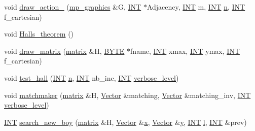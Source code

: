\begin{DoxyCompactItemize}
\item 
void \mbox{\hyperlink{test_8_c_a66d5226d368c0fb8c9578ff6f3462dfc}{draw\+\_\+action\+\_\+}} (\mbox{\hyperlink{classmp__graphics}{mp\+\_\+graphics}} \&G, \mbox{\hyperlink{galois_8h_a09fddde158a3a20bd2dcadb609de11dc}{I\+NT}} $\ast$Adjacency, \mbox{\hyperlink{galois_8h_a09fddde158a3a20bd2dcadb609de11dc}{I\+NT}} m, \mbox{\hyperlink{galois_8h_a09fddde158a3a20bd2dcadb609de11dc}{I\+NT}} \mbox{\hyperlink{simeon_8_c_a7f2cd26777ce0ff3fdaf8d02aacbddfb}{n}}, \mbox{\hyperlink{galois_8h_a09fddde158a3a20bd2dcadb609de11dc}{I\+NT}} f\+\_\+cartesian)
\item 
void \mbox{\hyperlink{test_8_c_aba940d15eaa8abf972749535a2259ebe}{Halls\+\_\+theorem}} ()
\item 
void \mbox{\hyperlink{test_8_c_a4c1e9c00227321ddd2da4d252011fd07}{draw\+\_\+matrix}} (\mbox{\hyperlink{classmatrix}{matrix}} \&H, \mbox{\hyperlink{galois_8h_ab6cc7b4aeb6ea31aba2b3fbfc83ff5e6}{B\+Y\+TE}} $\ast$fname, \mbox{\hyperlink{galois_8h_a09fddde158a3a20bd2dcadb609de11dc}{I\+NT}} xmax, \mbox{\hyperlink{galois_8h_a09fddde158a3a20bd2dcadb609de11dc}{I\+NT}} ymax, \mbox{\hyperlink{galois_8h_a09fddde158a3a20bd2dcadb609de11dc}{I\+NT}} f\+\_\+cartesian)
\item 
void \mbox{\hyperlink{test_8_c_a757609870ae7ab0f1d0073415822d19f}{test\+\_\+hall}} (\mbox{\hyperlink{galois_8h_a09fddde158a3a20bd2dcadb609de11dc}{I\+NT}} \mbox{\hyperlink{simeon_8_c_a7f2cd26777ce0ff3fdaf8d02aacbddfb}{n}}, \mbox{\hyperlink{galois_8h_a09fddde158a3a20bd2dcadb609de11dc}{I\+NT}} nb\+\_\+inc, \mbox{\hyperlink{galois_8h_a09fddde158a3a20bd2dcadb609de11dc}{I\+NT}} \mbox{\hyperlink{simeon_8_c_a818073fbcc2f439e7c56952f67386122}{verbose\+\_\+level}})
\item 
void \mbox{\hyperlink{test_8_c_a93ef2c2e9896d2a9f32ced4136c2784a}{matchmaker}} (\mbox{\hyperlink{classmatrix}{matrix}} \&H, \mbox{\hyperlink{class_vector}{Vector}} \&matching, \mbox{\hyperlink{class_vector}{Vector}} \&matching\+\_\+inv, \mbox{\hyperlink{galois_8h_a09fddde158a3a20bd2dcadb609de11dc}{I\+NT}} \mbox{\hyperlink{simeon_8_c_a818073fbcc2f439e7c56952f67386122}{verbose\+\_\+level}})
\item 
\mbox{\hyperlink{galois_8h_a09fddde158a3a20bd2dcadb609de11dc}{I\+NT}} \mbox{\hyperlink{test_8_c_a00b262498218f35b2c1a68d8dd729714}{search\+\_\+new\+\_\+boy}} (\mbox{\hyperlink{classmatrix}{matrix}} \&H, \mbox{\hyperlink{class_vector}{Vector}} \&\mbox{\hyperlink{alphabet2_8_c_a6150e0515f7202e2fb518f7206ed97dc}{x}}, \mbox{\hyperlink{class_vector}{Vector}} \&\mbox{\hyperlink{alphabet2_8_c_a0a2f84ed7838f07779ae24c5a9086d33}{y}}, \mbox{\hyperlink{galois_8h_a09fddde158a3a20bd2dcadb609de11dc}{I\+NT}} \mbox{\hyperlink{alphabet2_8_c_a89606eca6b563ec68d2da2e84657736f}{l}}, \mbox{\hyperlink{galois_8h_a09fddde158a3a20bd2dcadb609de11dc}{I\+NT}} \&prev)

\end{DoxyCompactItemize}
